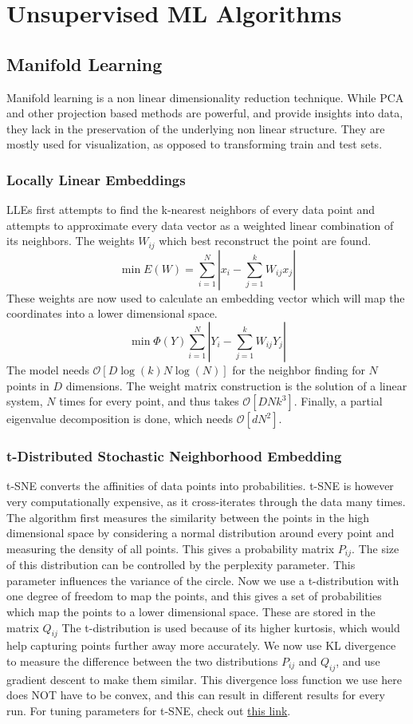 \documentclass{article}
\begin{document}
\section{Unsupervised ML Algorithms}

\subsection{Manifold Learning}
Manifold learning is a non linear dimensionality reduction technique. While PCA and other projection based methods are powerful, and provide insights into data, they lack in the preservation of the underlying non linear structure. They are mostly used for visualization, as opposed to transforming train and test sets.

\subsubsection{Locally Linear Embeddings}
LLEs first attempts to find the k-nearest neighbors of every data point and attempts to approximate every data vector as a weighted linear combination of its neighbors. The weights $W_{ij}$ which best reconstruct the point are found.
$$\min E(W) = \sum_{i=1}^N \left\lvert x_i - \sum_{j=1}^k W_{ij}x_j \right\rvert$$
These weights are now used to calculate an embedding vector which will map the coordinates into a lower dimensional space.
$$\min \Phi(Y)\sum_{i=1}^N \left\lvert Y_i - \sum_{j=1}^k W_{ij}Y_j \right\rvert$$
The model needs $\mathcal{O}[D \log(k) N \log(N)]$ for the neighbor finding for $N$ points in $D$ dimensions. The weight matrix construction is the solution of a linear system, $N$ times for every point, and thus takes $\mathcal{O}[DNk^3]$. Finally, a partial eigenvalue decomposition is done, which needs $\mathcal{O}[dN^2]$.

\subsubsection{t-Distributed Stochastic Neighborhood Embedding}
t-SNE converts the affinities of data points into probabilities. t-SNE is however very computationally expensive, as it cross-iterates through the data many times. The algorithm first measures the similarity between the points in the high dimensional space by considering a normal distribution around every point and measuring the density of all points. This gives a probability matrix $P_{ij}$. The size of this distribution can be controlled by the perplexity parameter. This parameter influences the variance of the circle. Now we use a t-distribution with one degree of freedom to map the points, and this gives a set of probabilities which map the points to a lower dimensional space. These are stored in the matrix $Q_{ij}$ The t-distribution is used because of its higher kurtosis, which would help capturing points further away more accurately. We now use KL divergence to measure the difference between the two distributions $P_{ij}$ and $Q_{ij}$, and use gradient descent to make them similar. This divergence loss function we use here does NOT have to be convex, and this can result in different results for every run. For tuning parameters for t-SNE, check out \href{https://distill.pub/2016/misread-tsne/}{this link}.
\end{document}
